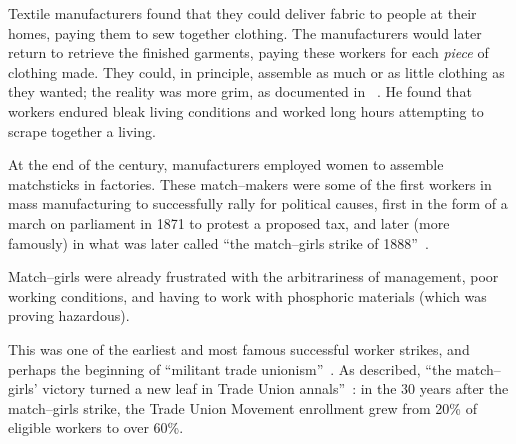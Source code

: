 \documentclass[trackingWork]{subfiles}
\begin{document}
Textile manufacturers found that they could deliver fabric to people at their homes,
paying them to sew together clothing.
The manufacturers would later return to retrieve the finished garments,
paying these workers for each \textit{piece} of clothing made.
They could, in principle, assemble as much or as little clothing as they wanted;
the reality was more grim, as
\citeauthor{riisOtherSideLives} documented in \citeyear{riisOtherSideLives}~\cite{riisOtherSideLives}.
He found that
workers endured bleak living conditions and
worked long hours attempting to scrape together a living.

At the end of the  century,
manufacturers employed women to assemble matchsticks in factories.
These match--makers were some of the first workers in mass manufacturing
to successfully rally for political causes,
first in the form of a march on parliament in 1871 to protest a proposed tax, and 
later (more famously) in what was later called ``the match--girls strike of 1888''~\cite{10.2307/3827491}.

Match--girls were already frustrated with
the arbitrariness of management,
poor working conditions, and
having to work with phosphoric materials (which was proving hazardous).

This was one of the earliest and most famous successful worker strikes,
and perhaps the beginning of ``militant trade unionism''~\cite{10.2307/3827491}.
As \citeauthor{weyer1894history} described,
``the match--girls' victory turned a new leaf in Trade Union annals''~\cite{weyer1894history}: in the 30 years after the match--girls strike,
the Trade Union Movement enrollment grew from 20\% of eligible workers to over 60\%.
\end{document}
